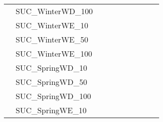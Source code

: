 \begin{table}[]
{\begin{tabular}{|c|l|ll|ll|ll|l|l|}
			& SUC\_WinterWD\_100            &                                   &                                  &                           &                          &                           &                          &                                       &                                \\
			& SUC\_WinterWE\_10             &                                   &                                  &                           &                          &                           &                          &                                       &                                \\
			& SUC\_WinterWE\_50             &                                   &                                  &                           &                          &                           &                          &                                       &                                \\
			& SUC\_WinterWE\_100            &                                   &                                  &                           &                          &                           &                          &                                       &                                \\
			& SUC\_SpringWD\_10             &                                   &                                  &                           &                          &                           &                          &                                       &                                \\
			& SUC\_SpringWD\_50             &                                   &                                  &                           &                          &                           &                          &                                       &                                \\
			& SUC\_SpringWD\_100            &                                   &                                  &                           &                          &                           &                          &                                       &                                \\
			& SUC\_SpringWE\_10             &                                   &                                  &                           &                          &                           &                          &                                       &                                \\

\end{tabular}}
\end{table}

